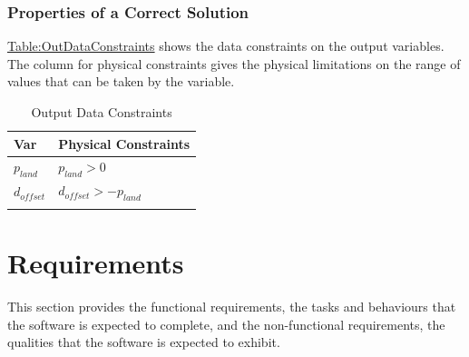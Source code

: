 \documentclass[12pt]{article}
\begin{document}
\subsubsection{Properties of a Correct Solution}
\label{Sec:CorSolProps}
\hyperref[Table:OutDataConstraints]{Table:OutDataConstraints} shows the data constraints on the output variables. The column for physical constraints gives the physical limitations on the range of values that can be taken by the variable.
\begin{longtable}{l l}
\toprule
\textbf{Var} & \textbf{Physical Constraints}
\\
\midrule
\endhead
${p_{land}}$ & ${p_{land}}>0$
\\
${d_{offset}}$ & ${d_{offset}}>-{p_{land}}$
\\
\bottomrule
\caption{Output Data Constraints}
\label{Table:OutDataConstraints}
\end{longtable}
\section{Requirements}
\label{Sec:Requirements}
This section provides the functional requirements, the tasks and behaviours that the software is expected to complete, and the non-functional requirements, the qualities that the software is expected to exhibit.
\end{document}
